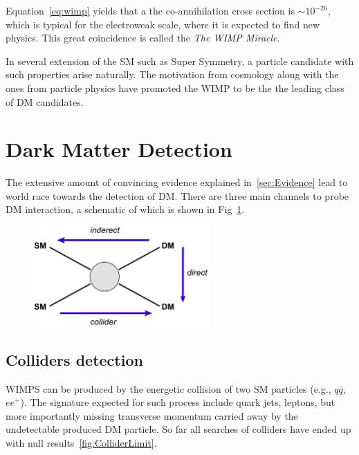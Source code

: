 Equation~\ref{eq:wimp} yields that a the co-annihilation cross section is $\sim 10^{-26}$, which is typical for the electroweak scale, where it is expected to find new physics. This great coincidence is called the \textit{The WIMP Miracle}.

In several extension of the SM such as Super Symmetry, a particle candidate with such properties arise naturally. The motivation from cosmology along with the ones from particle physics have promoted the WIMP to be the the leading class of DM candidates.   

\section{Dark Matter Detection}
\label{sec:DMDet}

The extensive amount of convincing evidence explained in~\ref{sec:Evidence} lead to world race towards the detection of DM. There are three main channels to probe DM interaction, a schematic of which is shown in Fig~\ref{fig:detectionScheme}.

\begin{figure}[]
	\centering
	\includegraphics[width=0.6\textwidth]{figs/detection_channels.png}
	\label{fig:detectionScheme}
\end{figure}  

\subsection{Colliders detection}
\label{subsec:collider}

WIMPS can be produced by the energetic collision of two SM particles (e.g., $q\bar{q}$, $ee^+$). The signature expected for such process include quark jets, leptons, but more importantly missing transverse momentum carried away by the undetectable produced DM particle. So far all searches of colliders have ended up with null results~\ref{fig:ColliderLimit}.  


